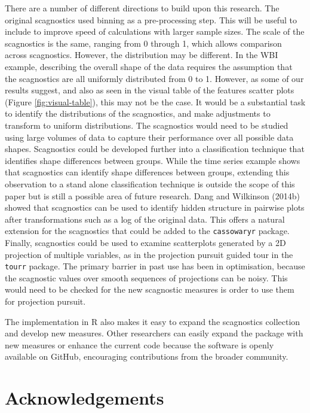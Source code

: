 There are a number of different directions to build upon this research. The original scagnostics used binning as a pre-processing step. This will be useful to include to improve speed of calculations with larger sample sizes. The scale of the scagnostics is the same, ranging from 0 through 1, which allows comparison across scagnostics. However, the distribution may be different. In the WBI example, describing the overall shape of the data requires the assumption that the scagnostics are all uniformly distributed from 0 to 1. However, as some of our results suggest, and also as seen in the visual table of the features scatter plots (Figure \ref{fig:visual-table}), this may not be the case. It would be a substantial task to identify the distributions of the scagnostics, and make adjustments to transform to uniform distributions. The scagnostics would need to be studied using large volumes of data to capture their performance over all possible data shapes. Scagnostics could be developed further into a classification technique that identifies shape differences between groups. While the time series example shows that scagnostics can identify shape differences between groups, extending this observation to a stand alone classification technique is outside the scope of this paper but is still a possible area of future research. Dang and Wilkinson (2014b) showed that scagnostics can be used to identify hidden structure in pairwise plots after transformations such as a log of the original data. This offers a natural extension for the scagnostics that could be added to the \texttt{cassowaryr} package. Finally, scagnostics could be used to examine scatterplots generated by a 2D projection of multiple variables, as in the projection pursuit guided tour in the \texttt{tourr} package. The primary barrier in past use has been in optimisation, because the scagnostic values over smooth sequences of projections can be noisy. This would need to be checked for the new scagnostic measures is order to use them for projection pursuit.

The implementation in R also makes it easy to expand the scagnostics collection and develop new measures. Other researchers can easily expand the package with new measures or enhance the current code because the software is openly available on GitHub, encouraging contributions from the broader community.

\hypertarget{acknowledgements}{%
\section{Acknowledgements}\label{acknowledgements}}

